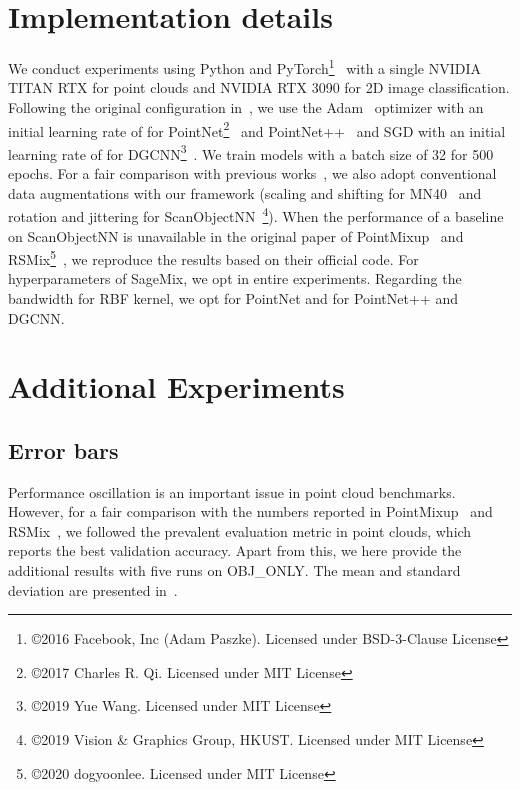 \documentclass{article}
\begin{document}
\section{Implementation details}
\label{sec:implementation}
We conduct experiments using Python and PyTorch\footnote{\copyright 2016 Facebook, Inc (Adam Paszke). Licensed under BSD-3-Clause License}~\cite{paszke2019pytorch} with a single NVIDIA TITAN RTX for point clouds and NVIDIA RTX 3090 for 2D image classification.
Following the original configuration in~\cite{qi2017pointnet,qi2017pointnet++,wang2019dynamic}, we use the Adam~\cite{DBLP:journals/corr/KingmaB14} optimizer with an initial learning rate of  for PointNet\footnote{\label{note1}\copyright 2017 Charles R. Qi. Licensed under MIT License}~\cite{qi2017pointnet} and PointNet++~\cite{qi2017pointnet++} and SGD with an initial learning rate of  for DGCNN\footnote{\copyright 2019 Yue Wang. Licensed under MIT License }~\cite{wang2019dynamic}. We train models with a batch size of 32 for 500 epochs.
For a fair comparison with previous works~\cite{chen2020pointmixup,lee2021regularization}, we also adopt conventional data augmentations with our framework (\ie scaling and shifting for MN40~\cite{3dwarehouse} and rotation and jittering for ScanObjectNN~\footnote{\copyright 2019 Vision \& Graphics Group, HKUST. Licensed under MIT License}\cite{uy2019revisiting}). When the performance of a baseline on ScanObjectNN is unavailable in the original paper of PointMixup~\cite{chen2020pointmixup} and RSMix\footnote{\copyright 2020 dogyoonlee. Licensed under MIT License}~\cite{lee2021regularization}, we reproduce the results based on their official code.
For hyperparameters of SageMix, we opt  in entire experiments. Regarding the bandwidth for RBF kernel, we opt  for PointNet and  for PointNet++ and DGCNN.
 \section{Additional Experiments}
\label{sec:experiments}

\subsection{Error bars}
\label{sec:errorbars}
Performance oscillation is an important issue in point cloud benchmarks. However, for a fair comparison with the numbers reported in PointMixup~\cite{chen2020pointmixup} and RSMix~\cite{lee2021regularization}, we followed the prevalent evaluation metric in point clouds, which reports the best validation accuracy. Apart from this, we here provide the additional results with five runs on OBJ\_ONLY. The mean and standard deviation are presented in~.
\end{document}
